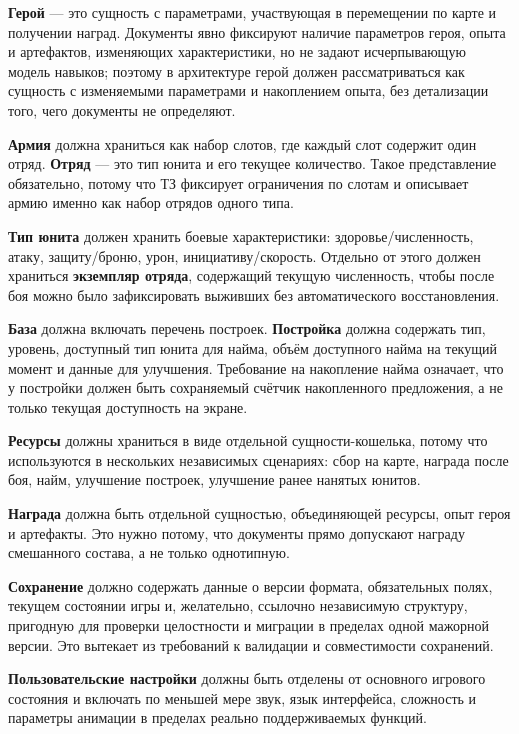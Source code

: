 \documentclass[12pt,a4paper]{article}
\begin{document}
\textbf{Герой} --- это сущность с параметрами, участвующая в перемещении по карте и получении наград. Документы явно фиксируют наличие параметров героя, опыта и артефактов, изменяющих характеристики, но не задают исчерпывающую модель навыков; поэтому в архитектуре герой должен рассматриваться как сущность с изменяемыми параметрами и накоплением опыта, без детализации того, чего документы не определяют.

\textbf{Армия} должна храниться как набор слотов, где каждый слот содержит один отряд. \textbf{Отряд} --- это тип юнита и его текущее количество. Такое представление обязательно, потому что ТЗ фиксирует ограничения по слотам и описывает армию именно как набор отрядов одного типа.

\textbf{Тип юнита} должен хранить боевые характеристики: здоровье/численность, атаку, защиту/броню, урон, инициативу/скорость. Отдельно от этого должен храниться \textbf{экземпляр отряда}, содержащий текущую численность, чтобы после боя можно было зафиксировать выживших без автоматического восстановления.

\textbf{База} должна включать перечень построек. \textbf{Постройка} должна содержать тип, уровень, доступный тип юнита для найма, объём доступного найма на текущий момент и данные для улучшения. Требование на накопление найма означает, что у постройки должен быть сохраняемый счётчик накопленного предложения, а не только текущая доступность на экране.

\textbf{Ресурсы} должны храниться в виде отдельной сущности-кошелька, потому что используются в нескольких независимых сценариях: сбор на карте, награда после боя, найм, улучшение построек, улучшение ранее нанятых юнитов.

\textbf{Награда} должна быть отдельной сущностью, объединяющей ресурсы, опыт героя и артефакты. Это нужно потому, что документы прямо допускают награду смешанного состава, а не только однотипную.

\textbf{Сохранение} должно содержать данные о версии формата, обязательных полях, текущем состоянии игры и, желательно, ссылочно независимую структуру, пригодную для проверки целостности и миграции в пределах одной мажорной версии. Это вытекает из требований к валидации и совместимости сохранений.

\textbf{Пользовательские настройки} должны быть отделены от основного игрового состояния и включать по меньшей мере звук, язык интерфейса, сложность и параметры анимации в пределах реально поддерживаемых функций.
\end{document}
